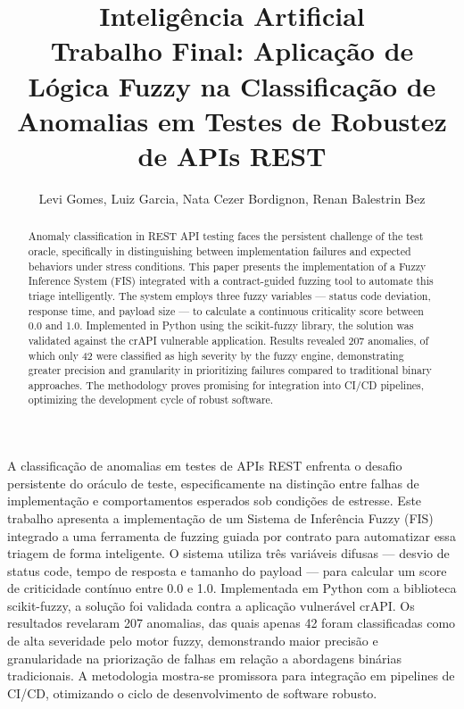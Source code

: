 \documentclass[12pt]{article}
\title{Inteligência Artificial\\ Trabalho Final: Aplicação de Lógica Fuzzy na Classificação de Anomalias em Testes de Robustez de APIs REST}
\author{Levi Gomes\inst{1}, Luiz Garcia\inst{1}, Nata Cezer Bordignon\inst{1}, Renan Balestrin Bez\inst{1}}
\begin{document}
\maketitle

\begin{resumo}
A classificação de anomalias em testes de APIs REST enfrenta o desafio persistente do oráculo de teste, especificamente na distinção entre falhas de implementação e comportamentos esperados sob condições de estresse. Este trabalho apresenta a implementação de um Sistema de Inferência Fuzzy (FIS) integrado a uma ferramenta de fuzzing guiada por contrato para automatizar essa triagem de forma inteligente. O sistema utiliza três variáveis difusas — desvio de status code, tempo de resposta e tamanho do payload — para calcular um score de criticidade contínuo entre 0.0 e 1.0. Implementada em Python com a biblioteca scikit-fuzzy, a solução foi validada contra a aplicação vulnerável crAPI. Os resultados revelaram 207 anomalias, das quais apenas 42 foram classificadas como de alta severidade pelo motor fuzzy, demonstrando maior precisão e granularidade na priorização de falhas em relação a abordagens binárias tradicionais. A metodologia mostra-se promissora para integração em pipelines de CI/CD, otimizando o ciclo de desenvolvimento de software robusto.
\end{resumo}

\begin{abstract}
Anomaly classification in REST API testing faces the persistent challenge of the test oracle, specifically in distinguishing between implementation failures and expected behaviors under stress conditions. This paper presents the implementation of a Fuzzy Inference System (FIS) integrated with a contract-guided fuzzing tool to automate this triage intelligently. The system employs three fuzzy variables — status code deviation, response time, and payload size — to calculate a continuous criticality score between 0.0 and 1.0. Implemented in Python using the scikit-fuzzy library, the solution was validated against the crAPI vulnerable application. Results revealed 207 anomalies, of which only 42 were classified as high severity by the fuzzy engine, demonstrating greater precision and granularity in prioritizing failures compared to traditional binary approaches. The methodology proves promising for integration into CI/CD pipelines, optimizing the development cycle of robust software.
\end{abstract}













\renewcommand{\refname}{Refer\^encias}


\end{document}
